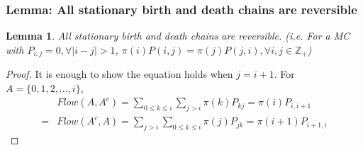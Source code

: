 \documentclass[11pt,a4paper]{article}
\newtheorem{lemma}{Lemma}
\begin{document}
\subsubsection{Lemma: All stationary birth and death chains are reversible}
\begin{lemma}
    All stationary birth and death chains are reversible. (i.e. For a MC with $P_{i,j}=0,\forall |i-j|>1$, $\pi(i)P(i,j)=\pi(j)P(j,i),\forall i,j\in \mathbb{Z}_+$)
\end{lemma}
\begin{proof}
    It is enough to show the equation holds when $j = i + 1$. For $A=\{0,1,2,...,i\}$,
    \begin{equation}
        \begin{aligned}
            &Flow(A,A^c)=\sum_{0\leq k\leq i}\sum_{j>i}\pi(k)P_{kj}=\pi(i)P_{i,i+1}\\
            =&Flow(A^c,A)=\sum_{j>i}\sum_{0\leq k\leq i}\pi(j)P_{jk}=\pi(i+1)P_{i+1,i}
        \end{aligned}
        \nonumber
    \end{equation}
\end{proof}
\end{document}
